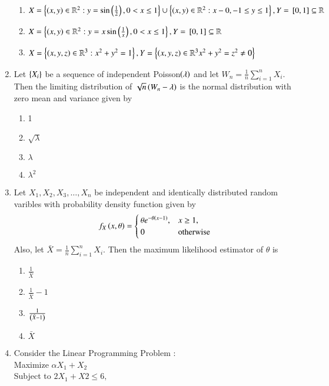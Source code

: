 \documentclass[journal]{IEEEtran}
\begin{document}
\begin{enumerate}
\begin{enumerate}
	\item $X=\left\{\left(x,y\right)\in \mathbb{R}^2 : y=\sin\left(\frac{1}{2}\right),0<x\le 1\right\}\cup \left\{\left(x,y\right)\in \mathbb{R}^2: x-0,-1\le y \le 1\right\},Y={}\left[0,1\right]\subseteq \mathbb{R}$
	\item $X=\left\{\left(x,y\right)\in \mathbb{R}^2:y=x\sin\left(\frac{1}{x}\right),0<x \le 1\right\}, Y={}\left[0,1\right]\subseteq \mathbb{R}$
	\item $X=\left\{\left(x,y,z\right)\in \mathbb{R}^3 : x^2+y^2=1\right\}, Y=\left\{\left(x,y,z\right)\in \mathbb{R}^3 x^2+y^2=z^2\neq0\right\}$
\end{enumerate}
\item Let $\left\{X_i\right\}$ be a sequence of independent Poisson$\left(\lambda\right)$ and let $W_n=\frac{1}{n}\sum_{i=1}^n X_i$. Then the limiting distribution of $\sqrt{n}\left(W_n-\lambda\right)$ is the normal distribution with zero mean and variance given by 
\begin{multicols}{4}
    \begin{enumerate}
        \item 1
        \item $\sqrt{\lambda}$
        \item $\lambda$
        \item $\lambda^2$
    \end{enumerate}
\end{multicols}
\item Let $X_1,X_2,X_3,\dots,X_n$ be independent and identically distributed random varibles with probability density function given by 
\begin{align*}
    f_X\left(x,\theta\right)=
    \begin{cases}
        \theta e^{-\theta\left(x-1\right)}, & x \ge 1,\\ 0 & \text{otherwise} 
    \end{cases}
\end{align*}
Also, let $\bar{X}=\frac{1}{n}\sum_{i=1}^nX_i$. Then the maximum likelihood estimator of $\theta$ is 
\begin{multicols}{4}
    \begin{enumerate}
        \item $\frac{1}{\bar{X}}$
        \item $\frac{1}{\bar{X}}-1$
        \item $\frac{1}{\left(\bar{X}-1\right)}$
        \item $\bar{X}$
    \end{enumerate}
\end{multicols}
\item Consider the Linear Programming Problem :\\
\hspace{2cm} Maximize \hspace{0.2cm} $\alpha X_1+X_2$\\
\hspace{2cm} Subject to \hspace{.02cm} $2X_1+X2\leq 6,$


\end{enumerate}
\end{document}
